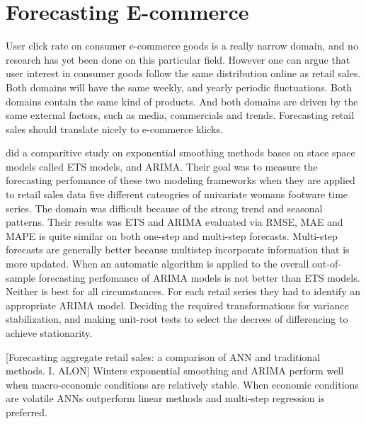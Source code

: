 \section{Forecasting E-commerce}
\label{section:RelatedWork:forecasting-ecommerce}
User click rate on consumer e-commerce goods is a really narrow domain, and no
research has yet been done on this particular field.
However one can argue that user interest in consumer goods follow the same distribution
online as retail sales.
Both domains will have the same weekly, and yearly periodic fluctuations.
Both domains contain the same kind of products.
And both domains are driven by the same external factors, such as media, commercials 
and trends.
Forecasting retail sales should translate nicely to e-commerce klicks.

\cite{Ramos2015} did a comparitive study on exponential smoothing 
methods bases on stace space models called ETS models, and ARIMA.
Their goal was to measure the forecasting perfomance of these two modeling frameworks
when they are applied to retail sales data
five different cateogries of univariate womans footware time series.
The domain was difficult because of the strong trend and seasonal patterns.
Their results was ETS and ARIMA evaluated via RMSE, MAE and MAPE is quite similar on both
one-step and multi-step forecasts. Multi-step forecasts are generally better
because multistep incorporate information that is more updated.
When an automatic algorithm is applied to the overall out-of-sample
forecasting perfomance of ARIMA models is not better than ETS models.
Neither is best for all circumstances.
For each retail series they had to identify an appropriate ARIMA model.
Deciding the required transformations for variance stabilization, and making unit-root
tests to select the decrees of differencing to achieve stationarity.



[Forecasting aggregate retail sales: a comparison of ANN and traditional methods. I. ALON]
Winters exponential smoothing and ARIMA perform well when macro-economic
conditions are relatively stable. When economic conditions are volatile
ANNs outperform linear methods and multi-step regression is preferred.

